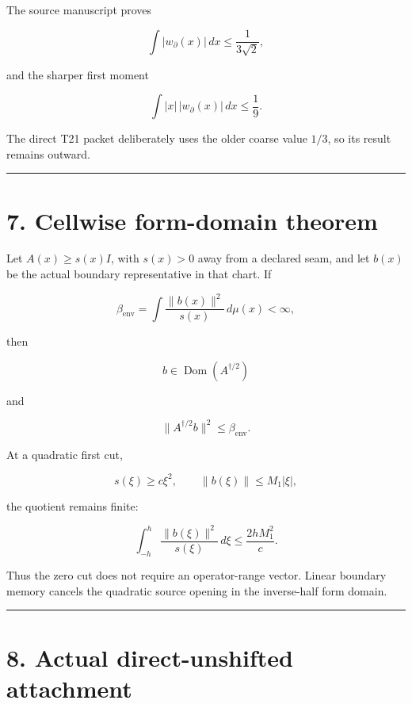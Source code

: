 The source manuscript proves

\[
\int |w_\partial(x)|\,dx
\le\frac{1}{3\sqrt2},
\]

and the sharper first moment

\[
\int |x|\,|w_\partial(x)|\,dx
\le\frac19.
\]

The direct T21 packet deliberately uses the older coarse value \(1/3\), so its
result remains outward.

\begin{center}\rule{0.5\linewidth}{0.5pt}\end{center}

\hypertarget{cellwise-form-domain-theorem}{%
\section{7. Cellwise form-domain theorem}\label{cellwise-form-domain-theorem}}

Let \(A(x)\ge s(x)I\), with \(s(x)>0\) away from a declared seam, and let
\(b(x)\) be the actual boundary representative in that chart. If

\[
\beta_{\mathrm{env}}
=
\int\frac{\|b(x)\|^2}{s(x)}\,d\mu(x)
<\infty,
\]

then

\[
b\in\operatorname{Dom}(A^{\dagger/2})
\]

and

\[
\boxed{
\|A^{\dagger/2}b\|^2
\le
\beta_{\mathrm{env}}.
}
\tag{7.1}
\]

At a quadratic first cut,

\[
s(\xi)\ge c\xi^2,
\qquad
\|b(\xi)\|\le M_1|\xi|,
\]

the quotient remains finite:

\[
\boxed{
\int_{-h}^{h}
\frac{\|b(\xi)\|^2}{s(\xi)}\,d\xi
\le
\frac{2hM_1^2}{c}.
}
\tag{7.2}
\]

Thus the zero cut does not require an operator-range vector. Linear boundary
memory cancels the quadratic source opening in the inverse-half form domain.

\begin{center}\rule{0.5\linewidth}{0.5pt}\end{center}

\hypertarget{actual-direct-unshifted-attachment}{%
\section{8. Actual direct-unshifted attachment}\label{actual-direct-unshifted-attachment}}

